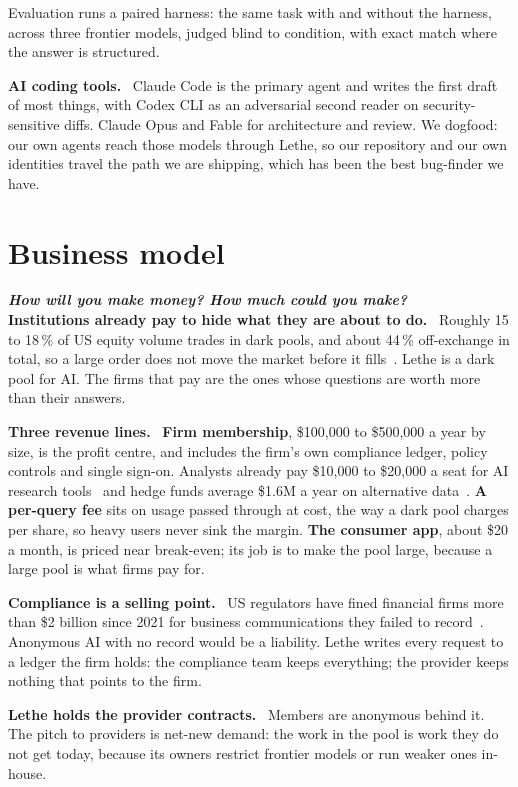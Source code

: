\documentclass[9pt,twocolumn,a4paper]{extarticle}
\newcommand{\para}[1]{\vspace{3pt}\textbf{#1}\ }
\newcommand{\q}[1]{{\fontsize{7}{9}\selectfont\bfseries\itshape\color{indigo!80!black}#1}\\[2pt]}
\begin{document}
Evaluation runs a paired harness: the same task with and without the harness, across three frontier models, judged blind to condition, with exact match where the answer is structured.

\para{AI coding tools.} Claude Code is the primary agent and writes the first draft of most things, with Codex CLI as an adversarial second reader on security-sensitive diffs. Claude Opus and Fable for architecture and review. We dogfood: our own agents reach those models through Lethe, so our repository and our own identities travel the path we are shipping, which has been the best bug-finder we have.

\section{Business model}
\q{How will you make money? How much could you make?}

\para{Institutions already pay to hide what they are about to do.} Roughly 15 to 18\,\% of US equity volume trades in dark pools, and about 44\,\% off-exchange in total, so a large order does not move the market before it fills~\cite{dark}. Lethe is a dark pool for AI. The firms that pay are the ones whose questions are worth more than their answers.

\para{Three revenue lines.} \textbf{Firm membership}, \$100{,}000 to \$500{,}000 a year by size, is the profit centre, and includes the firm's own compliance ledger, policy controls and single sign-on. Analysts already pay \$10{,}000 to \$20{,}000 a seat for AI research tools~\cite{finai} and hedge funds average \$1.6M a year on alternative data~\cite{altdata}. \textbf{A per-query fee} sits on usage passed through at cost, the way a dark pool charges per share, so heavy users never sink the margin. \textbf{The consumer app}, about \$20 a month, is priced near break-even; its job is to make the pool large, because a large pool is what firms pay for.

\para{Compliance is a selling point.} US regulators have fined financial firms more than \$2 billion since 2021 for business communications they failed to record~\cite{sec}. Anonymous AI with no record would be a liability. Lethe writes every request to a ledger the firm holds: the compliance team keeps everything; the provider keeps nothing that points to the firm.

\para{Lethe holds the provider contracts.} Members are anonymous behind it. The pitch to providers is net-new demand: the work in the pool is work they do not get today, because its owners restrict frontier models or run weaker ones in-house.
\end{document}
